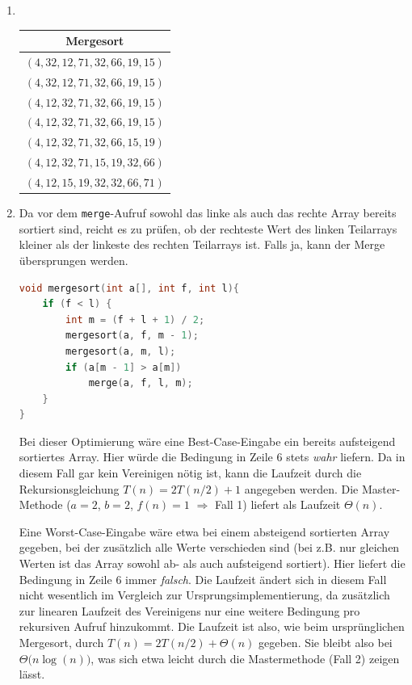 \documentclass[11pt,a4paper]{article}
\begin{document}
\begin{loesung}
    \begin{enumerate}
        \item \ \\
        \begin{table}[h!]
            \centering
            \begin{tabular}{|c|}
            \hline
            \textbf{Mergesort} \\ \hline
                $(4, 32, 12, 71, 32, 66, 19, 15)$ \\ \hline
                $(4, 32, 12, 71, 32, 66, 19, 15)$ \\ \hline
                $(4, 12, 32, 71, 32, 66, 19, 15)$ \\ \hline
                $(4, 12, 32, 71, 32, 66, 19, 15)$ \\ \hline
                $(4, 12, 32, 71, 32, 66, 15, 19)$ \\ \hline
                $(4, 12, 32, 71, 15, 19, 32, 66)$ \\ \hline
                $(4, 12, 15, 19, 32, 32, 66, 71)$ \\ \hline
            \end{tabular}
        \end{table}

        \item
        Da vor dem \texttt{merge}-Aufruf sowohl das linke als auch das rechte Array bereits sortiert sind, reicht es zu prüfen, ob der rechteste Wert des linken Teilarrays kleiner als der linkeste des rechten Teilarrays ist. Falls ja, kann der Merge übersprungen werden.
        \begin{lstlisting}[language=c++]
void mergesort(int a[], int f, int l){
    if (f < l) {
        int m = (f + l + 1) / 2;
        mergesort(a, f, m - 1);
        mergesort(a, m, l);
        if (a[m - 1] > a[m])
            merge(a, f, l, m);
    }
} 
        \end{lstlisting}
        Bei dieser Optimierung wäre eine Best-Case-Eingabe ein bereits aufsteigend sortiertes Array.
        Hier würde die Bedingung in Zeile 6 stets \emph{wahr} liefern.
        Da in diesem Fall gar kein Vereinigen nötig ist, kann die Laufzeit durch die Rekursionsgleichung $T(n) = 2 T(n / 2) + 1$ angegeben werden.
        Die Master-Methode ($a = 2$, $b = 2$, $f(n) = 1$ $\Rightarrow$ Fall 1) liefert als Laufzeit $\Theta(n)$.

        Eine Worst-Case-Eingabe wäre etwa bei einem absteigend sortierten Array gegeben, bei der zusätzlich alle Werte verschieden sind (bei z.B. nur gleichen Werten ist das Array sowohl ab- als auch aufsteigend sortiert).
        Hier liefert die Bedingung in Zeile 6 immer \emph{falsch}.
        Die Laufzeit ändert sich in diesem Fall nicht wesentlich im Vergleich zur Ursprungsimplementierung, da zusätzlich zur linearen Laufzeit des Vereinigens nur eine weitere Bedingung pro rekursiven Aufruf hinzukommt.
        Die Laufzeit ist also, wie beim ursprünglichen Mergesort, durch $T(n) = 2 T(n / 2) + \Theta(n)$ gegeben.
        Sie bleibt also bei $\Theta\big(n \log(n)\big)$, was sich etwa leicht durch die Mastermethode (Fall 2) zeigen lässt.


\end{enumerate}
\end{loesung}
\end{document}
